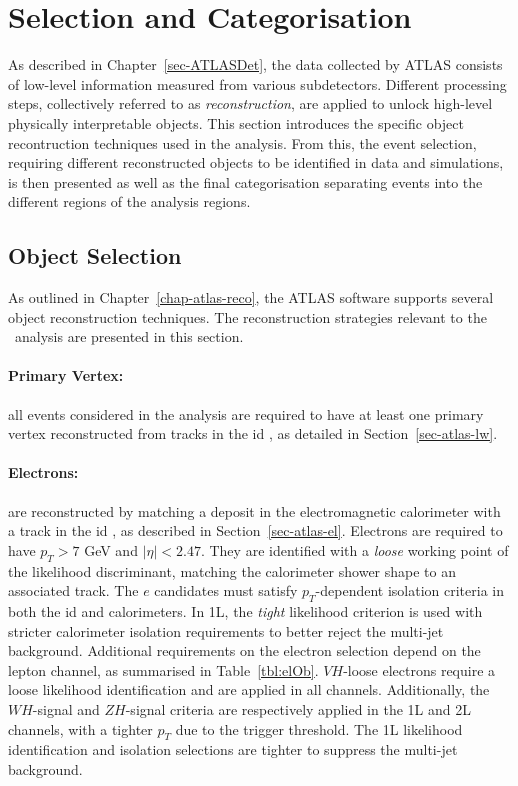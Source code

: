 
\section{Selection and Categorisation}\label{sec-selectionandcat}
As described in Chapter~\ref{sec-ATLASDet}, the data collected by ATLAS consists of low-level information measured from various subdetectors. Different processing steps, collectively referred to as \textit{reconstruction}, are applied to unlock high-level physically interpretable objects. This section introduces the specific object recontruction techniques used in the analysis. From this, the event selection, requiring different reconstructed objects to be identified in data and simulations, is then presented as well as the final categorisation separating events into the different regions of the analysis regions.

\subsection{Object Selection}\label{sec-obj}
As outlined in Chapter~\ref{chap-atlas-reco}, the ATLAS software supports several object reconstruction techniques. The reconstruction strategies relevant to the \vhbc\ analysis are presented in this section. 

\paragraph{Primary Vertex:} all events considered in the analysis are required to have at least one primary vertex reconstructed from tracks in the \gls{id} \cite{ATL-PHYS-PUB-2015-026}, as detailed in Section~\ref{sec-atlas-lw}.

\paragraph{Electrons:} are reconstructed by matching a deposit in the electromagnetic calorimeter with a track in the \gls{id} \cite{Aaboud:2657964, Aad_2019}, as described in Section~\ref{sec-atlas-el}. Electrons are required to have $p_T > 7$ GeV and $|\eta|<2.47$. They are identified with a \textit{loose} working point of the likelihood discriminant, matching the calorimeter shower shape to an associated track. The $e$ candidates must satisfy $p_T$-dependent isolation criteria in both the \gls{id} and calorimeters. In 1L, the \textit{tight} likelihood criterion is used with stricter calorimeter isolation requirements to better reject the multi-jet background. Additional requirements on the electron selection depend on the lepton channel, as summarised in Table~\ref{tbl:elOb}. $VH$-loose electrons require a loose likelihood identification and are applied in all channels. Additionally, the $WH$-signal and $ZH$-signal criteria are respectively applied in the 1L and 2L channels, with a tighter $p_T$ due to the trigger threshold. The 1L likelihood identification and isolation selections are tighter to suppress the multi-jet background. 

